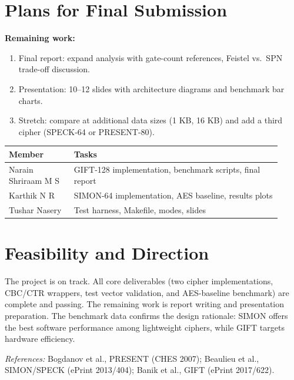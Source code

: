 \documentclass[10pt]{article}
\begin{document}
\section{Plans for Final Submission}
\textbf{Remaining work:}
\begin{enumerate}
  \item Final report: expand analysis with gate-count references, Feistel vs.\ SPN trade-off discussion.
  \item Presentation: 10--12 slides with architecture diagrams and benchmark bar charts.
  \item Stretch: compare at additional data sizes (1 KB, 16 KB) and add a third cipher (SPECK-64 or PRESENT-80).
\end{enumerate}

\begin{table}[h]
\centering\small
\begin{tabular}{p{0.22\linewidth}p{0.7\linewidth}}
\toprule
\textbf{Member} & \textbf{Tasks} \\
\midrule
Narain Shriraam M S & GIFT-128 implementation, benchmark scripts, final report \\
Karthik N R & SIMON-64 implementation, AES baseline, results plots \\
Tushar Nasery & Test harness, Makefile, modes, slides \\
\bottomrule
\end{tabular}
\end{table}

\section*{Feasibility and Direction}
The project is on track. All core deliverables (two cipher implementations, CBC/CTR wrappers, test vector validation, and AES-baseline benchmark) are complete and passing. The remaining work is report writing and presentation preparation. The benchmark data confirms the design rationale: SIMON offers the best software performance among lightweight ciphers, while GIFT targets hardware efficiency.

\vspace{0.3em}
\small\textit{References:} Bogdanov et al., PRESENT (CHES 2007); Beaulieu et al., SIMON/SPECK (ePrint 2013/404); Banik et al., GIFT (ePrint 2017/622).
\end{document}
